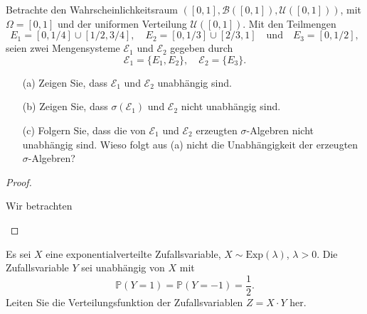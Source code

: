\begin{Problem}
	Betrachte den Wahrscheinlichkeitsraum \(( [0, 1], \mathcal{B}([0, 1]), \mathcal{U}([0, 1]))\), mit \(\Omega = [0, 1]\) und der uniformen Verteilung \(\mathcal{U}([0, 1])\). Mit den Teilmengen 
	\[
	E_1 = [0, 1/4] \cup [1/2, 3/4], \quad E_2 = [0, 1/3] \cup [2/3, 1] \quad \text{und} \quad E_3 = [0, 1/2],
	\]
	seien zwei Mengensysteme \(\mathcal{E}_1\) und \(\mathcal{E}_2\) gegeben durch 
	\[
	\mathcal{E}_1 = \{E_1, E_2\}, \quad \mathcal{E}_2 = \{E_3\}.
	\]
	
	\begin{enumerate}
		\item[(a)] Zeigen Sie, dass \(\mathcal{E}_1\) und \(\mathcal{E}_2\) unabhängig sind.
		\item[(b)] Zeigen Sie, dass \(\sigma(\mathcal{E}_1)\) und \(\mathcal{E}_2\) nicht unabhängig sind.
		\item[(c)] Folgern Sie, dass die von \(\mathcal{E}_1\) und \(\mathcal{E}_2\) erzeugten \(\sigma\)-Algebren nicht unabhängig sind. Wieso folgt aus (a) nicht die Unabhängigkeit der erzeugten \(\sigma\)-Algebren?
	\end{enumerate}
\end{Problem}
\begin{proof}
	\begin{parts}
		\item Wir betrachten
	\end{parts}
\end{proof}

\begin{Problem}
	Es sei \(X\) eine exponentialverteilte Zufallsvariable, \(X \sim \text{Exp}(\lambda)\), \(\lambda > 0\). Die Zufallsvariable \(Y\) sei unabhängig von \(X\) mit 
	\[
	\mathbb{P}(Y = 1) = \mathbb{P}(Y = -1) = \frac{1}{2}.
	\]
	Leiten Sie die Verteilungsfunktion der Zufallsvariablen \(Z = X \cdot Y\) her.
\end{Problem}